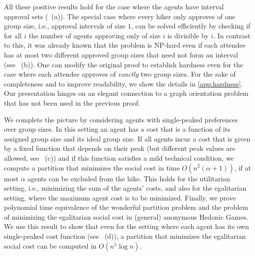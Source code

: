 \documentclass[a4paper]{article}
\begin{document}
All these positive results hold for the case where the agents have interval approval sets (~(a)). The special case where every hiker only approves of one group size, i.e., approval intervals of size $1$, 
can be solved efficiently by checking if for all $i$ the number of agents approving only of size $i$ is divisible by $i.$
In contrast to this, it was already known that the problem is NP-hard even if each attendee has at most two different approved group sizes that need not form an interval~\cite{Darmann_journal} (see ~(b)). One can modify the original proof to establish hardness even for the case where each attendee approves of \emph{exactly} two group sizes. For the sake of completeness and to improve readability, we show the details in \cref{app:hardness}. Our presentation hinges on an elegant connection to a graph orientation problem that has not been used in the previous proof.

We complete the picture by considering agents with single-peaked preferences over group sizes. In this setting an agent has a cost that is a function of its assigned group size and its ideal group size. If all agents incur a cost that is given by a fixed function that depends on their peak (but different peak values are allowed, see ~(c)) and if this function satisfies a mild technical condition, we compute a partition that minimizes the social cost in time $O(n^2(\alpha+1))$, if at most $\alpha$ agents can be excluded from the hike. This holds for the utilitarian setting, i.e., minimizing the sum of the agents' costs, and also for the egalitarian setting, where the maximum agent cost is to be minimized. Finally, we prove polynomial time equivalence of the wonderful partition problem and the problem of minimizing the egalitarian social cost in (general) anonymous Hedonic Games. We use this result to show that even for the setting where each agent has its own single-peaked cost function (see ~(d)), a partition that minimizes the egalitarian social cost can be computed in $O(n^5\log n)$. 


\end{document}
